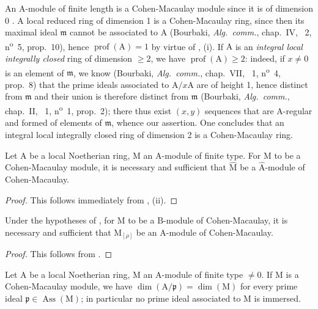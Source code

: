 An $\mathrm{A}$-module of finite length is a Cohen-Macaulay module since it is of dimension 0 .
A local reduced ring of dimension 1 is a Cohen-Macaulay ring, since then its maximal ideal $\mathfrak{m}$ cannot be associated to $\mathrm{A}$ (Bourbaki, \emph{Alg.~comm.}, chap.~IV, \textsection~2, n\textsuperscript{o}~5, prop.~10), hence $\operatorname{prof}(\mathrm{A})=1$ by virtue of , (i).
If $\mathrm{A}$ is an \emph{integral local integrally closed} ring of dimension $\geq 2$, we have $\operatorname{prof}(\mathrm{A})\geq 2$: indeed, if $x\neq 0$ is an element of $\mathfrak{m}$, we know (Bourbaki, \emph{Alg.~comm.}, chap.~VII, \textsection~1, n\textsuperscript{o}~4, prop.~8) that the prime ideals associated to $\mathrm{A}/x\mathrm{A}$ are of height 1, hence distinct from $\mathfrak{m}$ and their union is therefore distinct from $\mathfrak{m}$ (Bourbaki, \emph{Alg.~comm.}, chap.~II, \textsection~1, n\textsuperscript{o}~1, prop.~2); there thus exist $(x,y)$ sequences that are $\mathrm{A}$-regular and formed of elements of $\mathfrak{m}$, whence our assertion.
One concludes that an integral local integrally closed ring of dimension 2 is a Cohen-Macaulay ring.

\begin{proposition}[16.5.2]
\label{0.16.5.2}
Let $\mathrm{A}$ be a local Noetherian ring, $\mathrm{M}$ an $\mathrm{A}$-module of finite type.
For $\mathrm{M}$ to be a Cohen-Macaulay module, it is necessary and sufficient that $\widehat{\mathrm{M}}$ be a $\widehat{\mathrm{A}}$-module of Cohen-Macaulay.
\end{proposition}

\begin{proof}
This follows immediately from , (ii).
\end{proof}

\begin{proposition}[16.5.3]
\label{0.16.5.3}
Under the hypotheses of , for $\mathrm{M}$ to be a $\mathrm{B}$-module of Cohen-Macaulay, it is necessary and sufficient that $\mathrm{M}_{[\rho]}$ be an $\mathrm{A}$-module of Cohen-Macaulay.
\end{proposition}

\begin{proof}
This follows from .
\end{proof}

\begin{proposition}[16.5.4]
\label{0.16.5.4}
Let $\mathrm{A}$ be a local Noetherian ring, $\mathrm{M}$ an $\mathrm{A}$-module of finite type $\neq 0$.
If $\mathrm{M}$ is a Cohen-Macaulay module, we have $\dim(\mathrm{A}/\mathfrak{p})=\dim(\mathrm{M})$ for every prime ideal $\mathfrak{p}\in\operatorname{Ass}(\mathrm{M})$; in particular no prime ideal associated to $\mathrm{M}$ is immersed.
\end{proposition}

